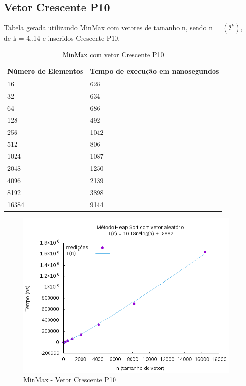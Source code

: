 \documentclass[12pt,a4paper,twoside]{report}
\begin{document}
\subsection{Vetor Crescente P10}
Tabela gerada utilizando MinMax com vetores de tamanho n, sendo n = $(2^k)$, de k = 4..14 e inseridos Crescente P10.
\begin{table}[H]
\centering
\caption{MinMax com vetor Crescente P10}
\label{my-label}
\begin{tabular}{|l|l|}
\hline
\multicolumn{1}{|c|}{\textbf{Número de Elementos}} & \multicolumn{1}{c|}{\textbf{Tempo de execução em nanosegundos}} \\ \hline
16 & 628 \\ \hline
32 & 634 \\ \hline
64 & 686 \\ \hline
128 & 492 \\ \hline
256 & 1042 \\ \hline
512 & 806 \\ \hline
1024 & 1087 \\ \hline
2048 & 1250 \\ \hline
4096 & 2139 \\ \hline
8192 & 3898 \\ \hline
16384 & 9144 \\ \hline
\end{tabular}
\end{table}

\begin{figure}[H]
    \centering
    \includegraphics[width=0.7\linewidth]{graficos/HeapSort/vIntAleatorio/vIntAleatorio.png}
  \caption{MinMax - Vetor Crescente P10}
\end{figure}
\end{document}
